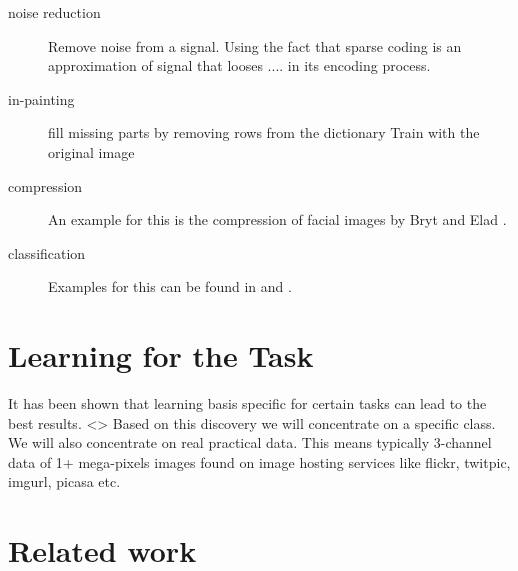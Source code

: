 \begin{description}
\item[noise reduction]
Remove noise from a signal. Using the fact that sparse coding 
is an approximation of signal that looses .... in its encoding process. 
\cite{Elad2006}

\item[in-painting]
fill missing parts by removing rows from the dictionary
Train with the original image
\cite{mairal08sparse}

\item[compression] An example for this is the compression of facial images by Bryt and Elad \cite{Bryt2008}.
\item[classification] Examples for this can be found in \cite{Mairal2008b} and \cite{Bar2009}.
\end{description}


\section{Learning for the Task}
It has been shown that learning basis specific for certain tasks can lead to the best results\cite{}.  <>
Based on this discovery we will concentrate on a specific class. 
We will also concentrate on real practical data. This means typically 3-channel data of 1+ mega-pixels images found on image hosting services like flickr, twitpic, imgurl, picasa etc.


\section{Related work}

